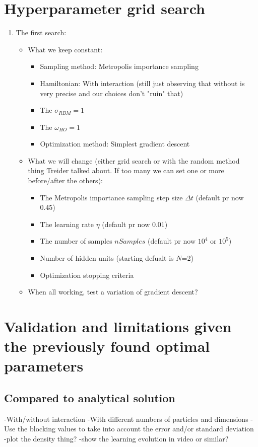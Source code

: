 \documentclass[twoside,english]{uiofysmaster}
\begin{document}
\section{Hyperparameter grid search}
\begin{enumerate}
	\item The first search:
	\begin{itemize}
		\item What we keep constant:
		\begin{itemize}
			\item Sampling method: Metropolis importance sampling
			\item Hamiltonian: With interaction (still just observing that without is very precise and our choices don't "ruin" that)
			\item The $\sigma_{RBM}=1$
			\item The $\omega_{HO}=1$
			\item Optimization method: Simplest gradient descent
		\end{itemize}
		\item What we will change (either grid search or with the random method thing Treider talked about. If too many we can set one or more before/after the others):
		\begin{itemize}
			\item The Metropolis importance sampling step size $\Delta t$ (default pr now 0.45)
			\item The learning rate $\eta$ (default pr now 0.01)
			\item The number of samples $nSamples$ (default pr now $10^4$ or $10^5$)
			\item Number of hidden units (starting defualt is $N$=2)
			\item Optimization stopping criteria
		\end{itemize}
		\item When all working, test a variation of gradient descent?
	\end{itemize}
\end{enumerate}

\section{Validation and limitations given the previously found optimal parameters}
\subsection{Compared to analytical solution}
-With/without interaction
-With different numbers of particles and dimensions
-Use the blocking values to take into account the error and/or standard deviation
-plot the density thing?
-show the learning evolution in video or similar?
\end{document}
